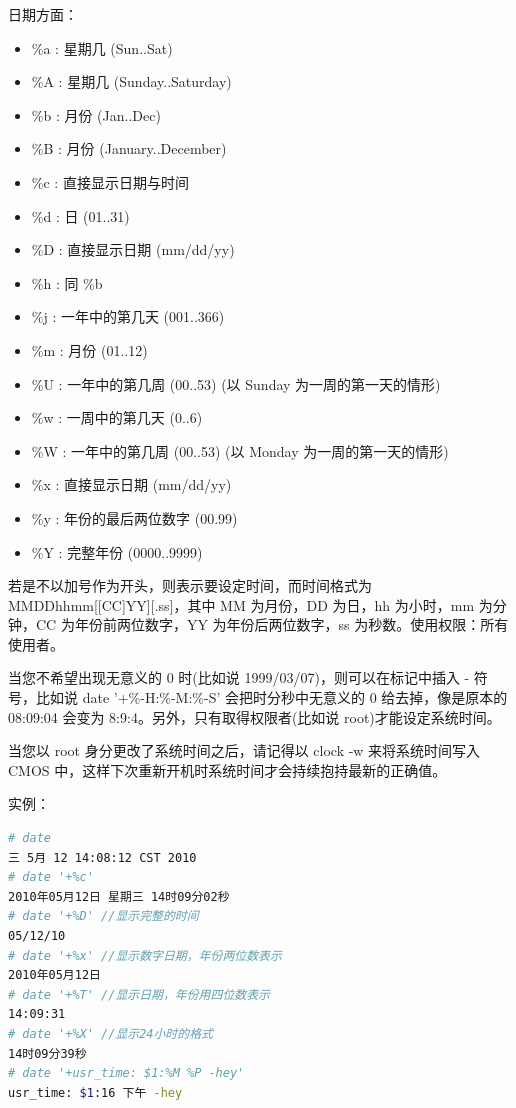 日期方面：
\begin{itemize}
\item\%a : 星期几 (Sun..Sat)
\item\%A : 星期几 (Sunday..Saturday)
\item\%b : 月份 (Jan..Dec)
\item\%B : 月份 (January..December)
\item\%c : 直接显示日期与时间
\item\%d : 日 (01..31)
\item\%D : 直接显示日期 (mm/dd/yy)
\item\%h : 同 \%b
\item\%j : 一年中的第几天 (001..366)
\item\%m : 月份 (01..12)
\item\%U : 一年中的第几周 (00..53) (以 Sunday 为一周的第一天的情形)
\item\%w : 一周中的第几天 (0..6)
\item\%W : 一年中的第几周 (00..53) (以 Monday 为一周的第一天的情形)
\item\%x : 直接显示日期 (mm/dd/yy)
\item\%y : 年份的最后两位数字 (00.99)
\item\%Y : 完整年份 (0000..9999)
\end{itemize}

若是不以加号作为开头，则表示要设定时间，而时间格式为 MMDDhhmm[[CC]YY][.ss]，其中 MM 为月份，DD 为日，hh 为小时，mm 为分钟，CC 为年份前两位数字，YY 为年份后两位数字，ss 为秒数。使用权限：所有使用者。

当您不希望出现无意义的 0 时(比如说 1999/03/07)，则可以在标记中插入 - 符号，比如说 date '+\%-H:\%-M:\%-S' 会把时分秒中无意义的 0 给去掉，像是原本的 08:09:04 会变为 8:9:4。另外，只有取得权限者(比如说 root)才能设定系统时间。

当您以 root 身分更改了系统时间之后，请记得以 clock -w 来将系统时间写入 CMOS 中，这样下次重新开机时系统时间才会持续抱持最新的正确值。

实例：
\begin{lstlisting}[language=sh]
# date
三 5月 12 14:08:12 CST 2010
# date '+%c' 
2010年05月12日 星期三 14时09分02秒
# date '+%D' //显示完整的时间
05/12/10
# date '+%x' //显示数字日期，年份两位数表示
2010年05月12日
# date '+%T' //显示日期，年份用四位数表示
14:09:31
# date '+%X' //显示24小时的格式
14时09分39秒
# date '+usr_time: $1:%M %P -hey'
usr_time: $1:16 下午 -hey
\end{lstlisting}



